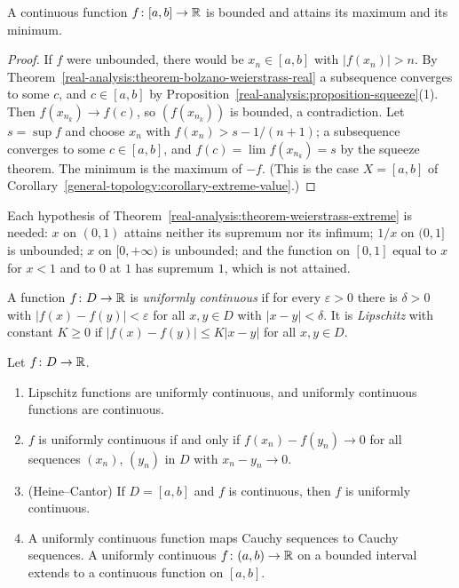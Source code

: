\begin{theorem}[Weierstrass]\label{real-analysis:theorem-weierstrass-extreme}
A continuous function $f \colon [a, b] \to \mathbb{R}$ is bounded and attains its maximum and its minimum.
\end{theorem}

\begin{proof}
If $f$ were unbounded, there would be $x_n \in [a, b]$ with $|f(x_n)| > n$. By Theorem~\ref{real-analysis:theorem-bolzano-weierstrass-real} a subsequence converges to some $c$, and $c \in [a, b]$ by
Proposition~\ref{real-analysis:proposition-squeeze}(1). Then $f(x_{n_k}) \to f(c)$, so $(f(x_{n_k}))$ is bounded, a contradiction. Let $s = \sup f$ and choose $x_n$ with $f(x_n) > s - 1/(n + 1)$; a subsequence converges to
some $c \in [a, b]$, and $f(c) = \lim f(x_{n_k}) = s$ by the squeeze theorem. The minimum is the maximum of $-f$. (This is the case $X = [a, b]$ of Corollary~\ref{general-topology:corollary-extreme-value}.)
\end{proof}

\begin{counterexample}\label{real-analysis:counterexample-extreme-value}
Each hypothesis of Theorem~\ref{real-analysis:theorem-weierstrass-extreme} is needed: $x$ on $(0, 1)$ attains neither its supremum nor its infimum; $1/x$ on $(0, 1]$ is unbounded; $x$ on $[0, +\infty)$ is
unbounded; and the function on $[0, 1]$ equal to $x$ for $x < 1$ and to $0$ at $1$ has supremum $1$, which is not attained.
\end{counterexample}

\begin{definition}\label{real-analysis:definition-uniform-continuity-real}
A function $f \colon D \to \mathbb{R}$ is \emph{uniformly continuous} if for every $\varepsilon > 0$ there is $\delta > 0$ with $|f(x) - f(y)| < \varepsilon$ for all $x, y \in D$ with $|x - y| < \delta$. It is
\emph{Lipschitz} with constant $K \geq 0$ if $|f(x) - f(y)| \leq K|x - y|$ for all $x, y \in D$.
\end{definition}

\begin{proposition}\label{real-analysis:proposition-uniform-continuity-real}
Let $f \colon D \to \mathbb{R}$.
\begin{enumerate}
\item Lipschitz functions are uniformly continuous, and uniformly continuous functions are continuous.
\item $f$ is uniformly continuous if and only if $f(x_n) - f(y_n) \to 0$ for all sequences $(x_n)$, $(y_n)$ in $D$ with $x_n - y_n \to 0$.
\item (Heine--Cantor) If $D = [a, b]$ and $f$ is continuous, then $f$ is uniformly continuous.
\item A uniformly continuous function maps Cauchy sequences to Cauchy sequences. A uniformly continuous $f \colon (a, b) \to \mathbb{R}$ on a bounded interval extends to a continuous function on $[a, b]$.
\end{enumerate}
\end{proposition}

